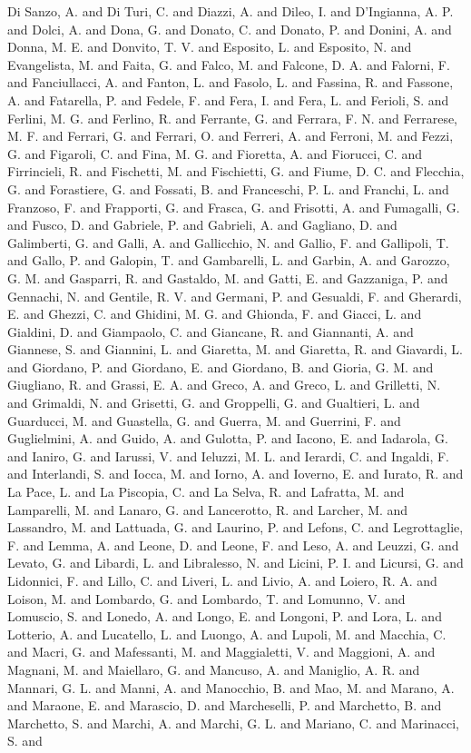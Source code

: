{{{{Di Sanzo, A.  and Di Turi, C.  and Diazzi, A.  and Dileo, I.  and D'Ingianna, A. P.  and Dolci, A.  and Dona, G.  and Donato, C.  and Donato, P.  and Donini, A.  and Donna, M. E.  and Donvito, T. V.  and Esposito, L.  and Esposito, N.  and Evangelista, M.  and Faita, G.  and Falco, M.  and Falcone, D. A.  and Falorni, F.  and Fanciullacci, A.  and Fanton, L.  and Fasolo, L.  and Fassina, R.  and Fassone, A.  and Fatarella, P.  and Fedele, F.  and Fera, I.  and Fera, L.  and Ferioli, S.  and Ferlini, M. G.  and Ferlino, R.  and Ferrante, G.  and Ferrara, F. N.  and Ferrarese, M. F.  and Ferrari, G.  and Ferrari, O.  and Ferreri, A.  and Ferroni, M.  and Fezzi, G.  and Figaroli, C.  and Fina, M. G.  and Fioretta, A.  and Fiorucci, C.  and Firrincieli, R.  and Fischetti, M.  and Fischietti, G.  and Fiume, D. C.  and Flecchia, G.  and Forastiere, G.  and Fossati, B.  and Franceschi, P. L.  and Franchi, L.  and Franzoso, F.  and Frapporti, G.  and Frasca, G.  and Frisotti, A.  and Fumagalli, G.  and Fusco, D.  and Gabriele, P.  and Gabrieli, A.  and Gagliano, D.  and Galimberti, G.  and Galli, A.  and Gallicchio, N.  and Gallio, F.  and Gallipoli, T.  and Gallo, P.  and Galopin, T.  and Gambarelli, L.  and Garbin, A.  and Garozzo, G. M.  and Gasparri, R.  and Gastaldo, M.  and Gatti, E.  and Gazzaniga, P.  and Gennachi, N.  and Gentile, R. V.  and Germani, P.  and Gesualdi, F.  and Gherardi, E.  and Ghezzi, C.  and Ghidini, M. G.  and Ghionda, F.  and Giacci, L.  and Gialdini, D.  and Giampaolo, C.  and Giancane, R.  and Giannanti, A.  and Giannese, S.  and Giannini, L.  and Giaretta, M.  and Giaretta, R.  and Giavardi, L.  and Giordano, P.  and Giordano, E.  and Giordano, B.  and Gioria, G. M.  and Giugliano, R.  and Grassi, E. A.  and Greco, A.  and Greco, L.  and Grilletti, N.  and Grimaldi, N.  and Grisetti, G.  and Groppelli, G.  and Gualtieri, L.  and Guarducci, M.  and Guastella, G.  and Guerra, M.  and Guerrini, F.  and Guglielmini, A.  and Guido, A.  and Gulotta, P.  and Iacono, E.  and Iadarola, G.  and Ianiro, G.  and Iarussi, V.  and Ieluzzi, M. L.  and Ierardi, C.  and Ingaldi, F.  and Interlandi, S.  and Iocca, M.  and Iorno, A.  and Ioverno, E.  and Iurato, R.  and La Pace, L.  and La Piscopia, C.  and La Selva, R.  and Lafratta, M.  and Lamparelli, M.  and Lanaro, G.  and Lancerotto, R.  and Larcher, M.  and Lassandro, M.  and Lattuada, G.  and Laurino, P.  and Lefons, C.  and Legrottaglie, F.  and Lemma, A.  and Leone, D.  and Leone, F.  and Leso, A.  and Leuzzi, G.  and Levato, G.  and Libardi, L.  and Libralesso, N.  and Licini, P. I.  and Licursi, G.  and Lidonnici, F.  and Lillo, C.  and Liveri, L.  and Livio, A.  and Loiero, R. A.  and Loison, M.  and Lombardo, G.  and Lombardo, T.  and Lomunno, V.  and Lomuscio, S.  and Lonedo, A.  and Longo, E.  and Longoni, P.  and Lora, L.  and Lotterio, A.  and Lucatello, L.  and Luongo, A.  and Lupoli, M.  and Macchia, C.  and Macri, G.  and Mafessanti, M.  and Maggialetti, V.  and Maggioni, A.  and Magnani, M.  and Maiellaro, G.  and Mancuso, A.  and Maniglio, A. R.  and Mannari, G. L.  and Manni, A.  and Manocchio, B.  and Mao, M.  and Marano, A.  and Maraone, E.  and Marascio, D.  and Marcheselli, P.  and Marchetto, B.  and Marchetto, S.  and Marchi, A.  and Marchi, G. L.  and Mariano, C.  and Marinacci, S.  and }}}}

